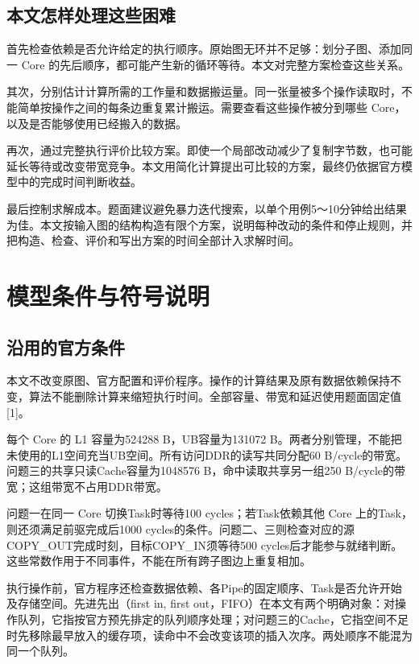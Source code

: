 \documentclass[anonymous,notoc]{gmcm2026}
\begin{document}
\subsection{本文怎样处理这些困难}

首先检查依赖是否允许给定的执行顺序。原始图无环并不足够：划分子图、添加同一 Core 的先后顺序，都可能产生新的循环等待。本文对完整方案检查这些关系。

其次，分别估计计算所需的工作量和数据搬运量。同一张量被多个操作读取时，不能简单按操作之间的每条边重复累计搬运。需要查看这些操作被分到哪些 Core，以及是否能够使用已经搬入的数据。

再次，通过完整执行评价比较方案。即使一个局部改动减少了复制字节数，也可能延长等待或改变带宽竞争。本文用简化计算提出可比较的方案，最终仍依据官方模型中的完成时间判断收益。

最后控制求解成本。题面建议避免暴力迭代搜索，以单个用例5～10分钟给出结果为佳。本文按输入图的结构构造有限个方案，说明每种改动的条件和停止规则，并把构造、检查、评价和写出方案的时间全部计入求解时间。


\section{模型条件与符号说明}

\subsection{沿用的官方条件}

本文不改变原图、官方配置和评价程序。操作的计算结果及原有数据依赖保持不变，算法不能删除计算来缩短执行时间。全部容量、带宽和延迟使用题面固定值{[}1{]}。

每个 Core 的 L1 容量为524288 B，UB容量为131072 B。两者分别管理，不能把未使用的L1空间充当UB空间。所有访问DDR的读写共同分配60 B/cycle的带宽。问题三的共享只读Cache容量为1048576 B，命中读取共享另一组250 B/cycle的带宽；这组带宽不占用DDR带宽。

问题一在同一 Core 切换Task时等待100 cycles；若Task依赖其他 Core 上的Task，则还须满足前驱完成后1000 cycles的条件。问题二、三则检查对应的源COPY\_OUT完成时刻，目标COPY\_IN须等待500 cycles后才能参与就绪判断。这些常数作用于不同事件，不能在所有跨子图边上重复相加。

执行操作前，官方程序还检查数据依赖、各Pipe的固定顺序、Task是否允许开始及存储空间。先进先出（first in, first out，FIFO）在本文有两个明确对象：对操作队列，它指按官方预先排定的队列顺序处理；对问题三的Cache，它指空间不足时先移除最早放入的缓存项，读命中不会改变该项的插入次序。两处顺序不能混为同一个队列。
\end{document}
